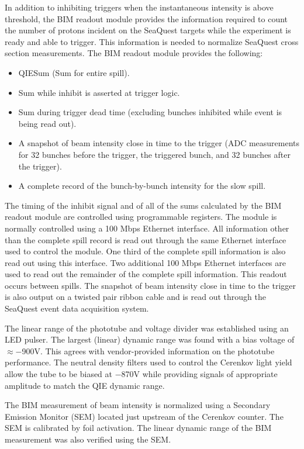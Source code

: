 In addition to inhibiting triggers when the instantaneous intensity is above threshold, the BIM readout module provides the information required to count the number of protons incident on the SeaQuest targets while the experiment is ready and able to trigger.  This information is needed to normalize SeaQuest cross section measurements.  The BIM readout module provides the following:
\begin{itemize}
\item QIESum (Sum for entire spill).
\item Sum while inhibit is asserted at trigger logic.
\item Sum during trigger dead time (excluding bunches inhibited while event is being read out).
\item A snapshot of beam intensity close in time to the trigger (ADC measurements for 32 bunches before the trigger, the triggered bunch, and 32 bunches after the trigger).
\item A complete record of the bunch-by-bunch intensity for the slow spill.
\end{itemize}
The timing of the inhibit signal and of all of the sums calculated by the BIM readout module are controlled using programmable registers.  The module is normally controlled using a 100 Mbps Ethernet interface.  All information other than the complete spill record is read out through the same Ethernet interface used to control the module.  One third of the complete spill information is also read out using this interface.  Two additional 100 Mbps Ethernet interfaces are used to read out the remainder of the complete spill information.  This readout occurs between spills.  The snapshot of beam intensity close in time to the trigger is also output on a twisted pair ribbon cable and is read out through the SeaQuest event data acquisition system.

The linear range of the phototube and voltage divider was established using an LED pulser.  The largest (linear) dynamic range was found with a bias voltage of $\approx-$900V.  This agrees with vendor-provided information on the phototube performance.  The neutral density filters used to control the Cerenkov light yield allow the tube to be biased at $-$870V while providing signals of appropriate amplitude to match the QIE dynamic range.

The BIM measurement of beam intensity is normalized using a Secondary Emission Monitor (SEM) located just upstream of the Cerenkov counter.  The SEM is calibrated by foil activation.  The linear dynamic range of the BIM measurement was also verified using the SEM.


